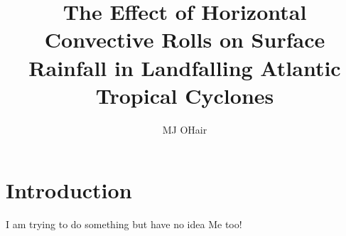 \documentclass[12pt]{article}
\author{MJ OHair} \title{The Effect of Horizontal Convective Rolls on Surface Rainfall in Landfalling Atlantic Tropical Cyclones}
\begin{document}
\maketitle


\section{Introduction}

I am trying to do something but have no idea
Me too!
\end{document}
